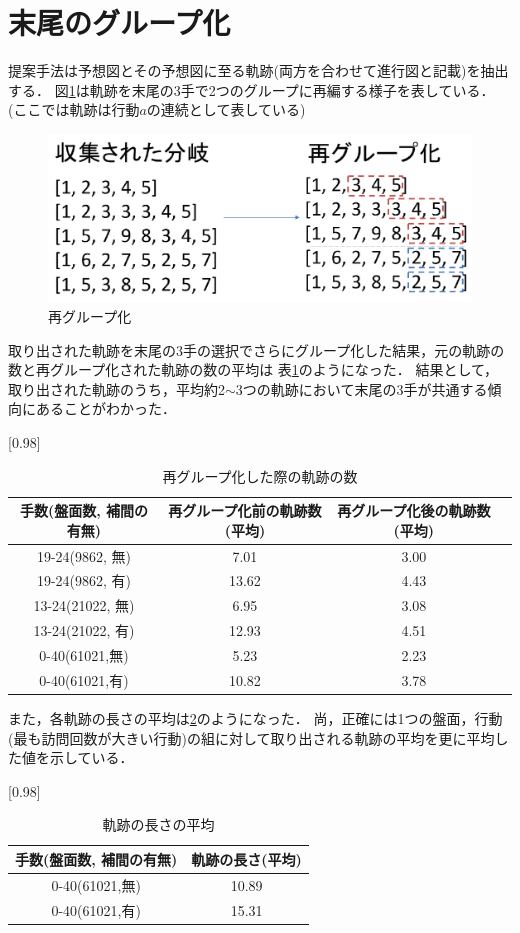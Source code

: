 \section{末尾のグループ化}
提案手法は予想図とその予想図に至る軌跡(両方を合わせて進行図と記載)を抽出する．
図\ref{fig:regroup}は軌跡を末尾の3手で2つのグループに再編する様子を表している．(ここでは軌跡は行動$a$の連続として表している)
\begin{figure}[htbp]
	\centering
	\includegraphics[width=\linewidth]{./figure/regroup.pdf}
	\caption{再グループ化}
	\label{fig:regroup}
\end{figure}
取り出された軌跡を末尾の3手の選択でさらにグループ化した結果，元の軌跡の数と再グループ化された軌跡の数の平均は
表\ref{table:tail}のようになった．
結果として，取り出された軌跡のうち，平均約2$\sim$3つの軌跡において末尾の3手が共通する傾向にあることがわかった．
\begin{table}[H]
	\caption{再グループ化した際の軌跡の数}
    \scriptsize
    \label{table:tail}
	\centering
	\scalebox{0.98}[0.98]{
		\begin{tabular}{c|c|c||c}
			手数(盤面数, 補間の有無)&  再グループ化前の軌跡数(平均)&  再グループ化後の軌跡数(平均)\\ \hline
			19-24(9862, 無)    & 7.01 & 3.00  \\
			19-24(9862, 有)    & 13.62 & 4.43  \\
			13-24(21022, 無)   &  6.95& 3.08  \\
			13-24(21022, 有)   & 12.93 & 4.51 \\
		    0-40(61021,無)& 5.23 & 2.23\\
		    0-40(61021,有)& 10.82 & 3.78\\
		\end{tabular}
	}

	
\end{table}
また，各軌跡の長さの平均は\ref{fig:length}のようになった．
尚，正確には1つの盤面，行動(最も訪問回数が大きい行動)の組に対して取り出される軌跡の平均を更に平均した値を示している．
\begin{table}[H]
	\caption{軌跡の長さの平均}
    \scriptsize
    \label{fig:length}
	\centering
	\scalebox{0.98}[0.98]{
		\begin{tabular}{c|c}
			手数(盤面数, 補間の有無)&  軌跡の長さ(平均)\\ \hline
		    0-40(61021,無)& 10.89\\
		    0-40(61021,有)& 15.31\\
		\end{tabular}
	}	
\end{table}

